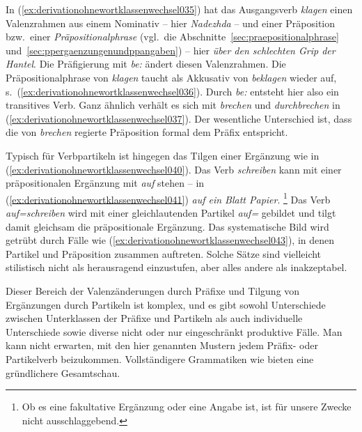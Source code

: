 In (\ref{ex:derivationohnewortklassenwechsel035}) hat das Ausgangsverb \textit{klagen} einen Valenzrahmen aus einem Nominativ -- hier \textit{Nadezhda} -- und einer Präposition bzw.\ einer \textit{Präpositionalphrase} (vgl.\ die Abschnitte~\ref{sec:praepositionalphrase} und~\ref{sec:ppergaenzungenundppangaben}) -- hier \textit{über den schlechten Grip der Hantel}.
Die Präfigierung mit \textit{be:} ändert diesen Valenzrahmen.
Die Präpositionalphrase von \textit{klagen} taucht als Akkusativ von \textit{beklagen} wieder auf, s.\ (\ref{ex:derivationohnewortklassenwechsel036}).
Durch \textit{be:} entsteht hier also ein transitives Verb.
Ganz ähnlich verhält es sich mit \textit{brechen} und \textit{durchbrechen} in (\ref{ex:derivationohnewortklassenwechsel037}).
Der wesentliche Unterschied ist, dass die von \textit{brechen} regierte Präposition formal dem Präfix entspricht.

Typisch für Verbpartikeln ist hingegen das Tilgen einer Ergänzung wie in (\ref{ex:derivationohnewortklassenwechsel040}).
Das Verb \textit{schreiben} kann mit einer präpositionalen Ergänzung mit \textit{auf} stehen -- in (\ref{ex:derivationohnewortklassenwechsel041}) \textit{auf ein Blatt Papier}.%
\footnote{Ob es eine fakultative Ergänzung oder eine Angabe ist, ist für unsere Zwecke nicht ausschlaggebend.}
Das Verb \textit{auf=schreiben} wird mit einer gleichlautenden Partikel \textit{auf=} gebildet und tilgt damit gleichsam die präpositionale Ergänzung.
Das systematische Bild wird getrübt durch Fälle wie (\ref{ex:derivationohnewortklassenwechsel043}), in denen Partikel und Präposition zusammen auftreten.
Solche Sätze sind vielleicht stilistisch nicht als herausragend einzustufen, aber alles andere als inakzeptabel.

\begin{exe}
  \ex \label{ex:derivationohnewortklassenwechsel040}
  \begin{xlist}
  \end{xlist}
\end{exe}

Dieser Bereich der Valenzänderungen durch Präfixe und Tilgung von Ergänzungen durch Partikeln ist komplex, und es gibt sowohl Unterschiede zwischen Unterklassen der Präfixe und Partikeln als auch individuelle Unterschiede sowie diverse nicht oder nur eingeschränkt produktive Fälle.
Man kann nicht erwarten, mit den hier genannten Mustern jedem Präfix- oder Partikelverb beizukommen.
Vollständigere Grammatiken wie \citet{Eisenberg2013a} bieten eine gründlichere Gesamtschau.

